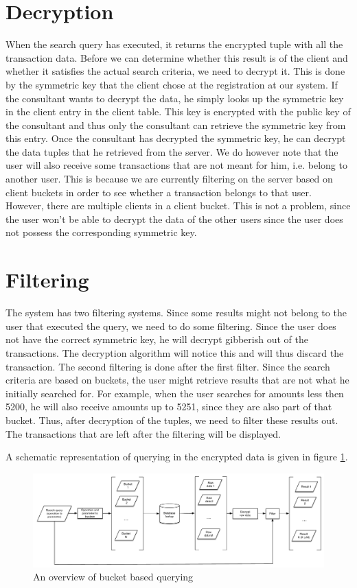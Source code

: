 \documentclass[a4paper]{article}
\begin{document}
\section{Decryption}
	When the search query has executed, it returns the encrypted tuple with all the transaction data. Before we can determine whether this result is of the client and whether it satisfies the actual search criteria, we need to decrypt it. This is done by the symmetric key that the client chose at the registration at our system. If the consultant wants to decrypt the data, he simply looks up the symmetric key in the client entry in the client table. This key is encrypted with the public key of the consultant and thus only the consultant can retrieve the symmetric key from this entry. Once the consultant has decrypted the symmetric key, he can decrypt the data tuples that he retrieved from the server. 
	We do however note that the user will also receive some transactions that are not meant for him, i.e. belong to another user. This is because we are currently filtering on the server based on client buckets in order to see whether a transaction belongs to that user. However, there are multiple clients in a client bucket. This is not a problem, since the user won't be able to decrypt the data of the other users since the user does not possess the corresponding symmetric key.   
    
\section{Filtering}
	The system has two filtering systems. Since some results might not belong to the user that executed the query, we need to do some filtering. Since the user does not have the correct symmetric key, he will decrypt gibberish out of the transactions. The decryption algorithm will notice this and will thus discard the transaction. The second filtering is done after the first filter. Since the search criteria are based on buckets, the user might retrieve results that are not what he initially searched for. For example, when the user searches for amounts less then 5200, he will also receive amounts up to 5251, since they are also part of that bucket. Thus, after decryption of the tuples, we need to filter these results out. The transactions that are left after the filtering will be displayed.
    
   	A schematic representation of querying in the encrypted data is given in figure \ref{fig:queries}.
    \begin{figure}
    \centering
    \includegraphics[scale=0.4]{queries.pdf}
    \caption{An overview of bucket based querying}
    \label{fig:queries}
    \end{figure}
\end{document}
